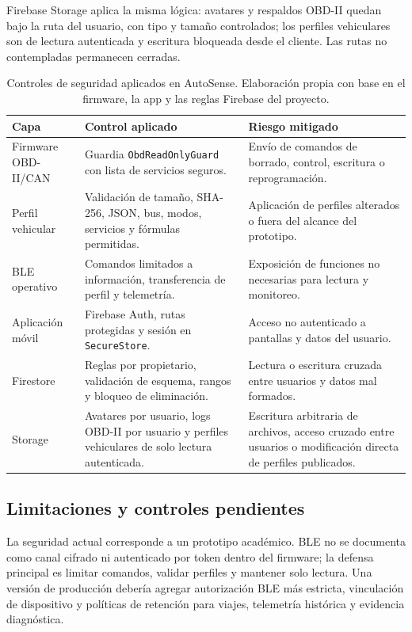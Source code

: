 \documentclass[12pt,letterpaper]{report}
\begin{document}
Firebase Storage aplica la misma lógica: avatares y respaldos OBD-II quedan bajo la ruta del usuario, con tipo y tamaño controlados; los perfiles vehiculares son de lectura autenticada y escritura bloqueada desde el cliente. Las rutas no contempladas permanecen cerradas.

\begin{table}[htbp]
\centering
\small
\caption{Controles de seguridad aplicados en AutoSense. Elaboración propia con base en el firmware, la app y las reglas Firebase del proyecto.}
\label{tab:system-security-controls}
\begin{tabular}{p{}p{}p{}}
\toprule
\textbf{Capa} & \textbf{Control aplicado} & \textbf{Riesgo mitigado} \\
\midrule
Firmware OBD-II/CAN & Guardia \texttt{ObdReadOnlyGuard} con lista de servicios seguros. & Envío de comandos de borrado, control, escritura o reprogramación. \\
\addlinespace
Perfil vehicular & Validación de tamaño, SHA-256, JSON, bus, modos, servicios y fórmulas permitidas. & Aplicación de perfiles alterados o fuera del alcance del prototipo. \\
\addlinespace
BLE operativo & Comandos limitados a información, transferencia de perfil y telemetría. & Exposición de funciones no necesarias para lectura y monitoreo. \\
\addlinespace
Aplicación móvil & Firebase Auth, rutas protegidas y sesión en \texttt{SecureStore}. & Acceso no autenticado a pantallas y datos del usuario. \\
\addlinespace
Firestore & Reglas por propietario, validación de esquema, rangos y bloqueo de eliminación. & Lectura o escritura cruzada entre usuarios y datos mal formados. \\
\addlinespace
Storage & Avatares por usuario, logs OBD-II por usuario y perfiles vehiculares de solo lectura autenticada. & Escritura arbitraria de archivos, acceso cruzado entre usuarios o modificación directa de perfiles publicados. \\
\bottomrule
\end{tabular}
\end{table}

\subsection{Limitaciones y controles pendientes}

La seguridad actual corresponde a un prototipo académico. BLE no se documenta como canal cifrado ni autenticado por token dentro del firmware; la defensa principal es limitar comandos, validar perfiles y mantener solo lectura. Una versión de producción debería agregar autorización BLE más estricta, vinculación de dispositivo y políticas de retención para viajes, telemetría histórica y evidencia diagnóstica.
\end{document}
